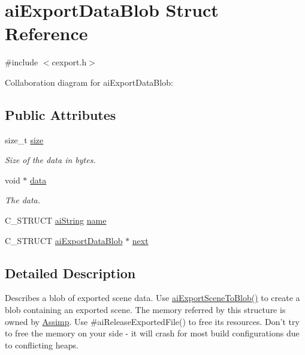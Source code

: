 \hypertarget{structai_export_data_blob}{\section{ai\+Export\+Data\+Blob Struct Reference}
\label{structai_export_data_blob}
}


{\ttfamily \#include $<$cexport.\+h$>$}



Collaboration diagram for ai\+Export\+Data\+Blob\+:
\subsection*{Public Attributes}
\begin{DoxyCompactItemize}
\item 
\hypertarget{structai_export_data_blob_a339bfaacc70396b2f99f94c1bc3b808f}{size\+\_\+t \hyperlink{structai_export_data_blob_a339bfaacc70396b2f99f94c1bc3b808f}{size}}\label{structai_export_data_blob_a339bfaacc70396b2f99f94c1bc3b808f}

\begin{DoxyCompactList}\small\item\em Size of the data in bytes. \end{DoxyCompactList}\item 
\hypertarget{structai_export_data_blob_ac080c780dad92077b42447d77a1a9ed1}{void $\ast$ \hyperlink{structai_export_data_blob_ac080c780dad92077b42447d77a1a9ed1}{data}}\label{structai_export_data_blob_ac080c780dad92077b42447d77a1a9ed1}

\begin{DoxyCompactList}\small\item\em The data. \end{DoxyCompactList}\item 
C\+\_\+\+S\+T\+R\+U\+C\+T \hyperlink{structai_string}{ai\+String} \hyperlink{structai_export_data_blob_af7f006ac5ad818c0d81d520a84f74c3e}{name}
\item 
C\+\_\+\+S\+T\+R\+U\+C\+T \hyperlink{structai_export_data_blob}{ai\+Export\+Data\+Blob} $\ast$ \hyperlink{structai_export_data_blob_a3e98fa760f45983ff1bccec6715f3817}{next}
\end{DoxyCompactItemize}


\subsection{Detailed Description}
Describes a blob of exported scene data. Use \hyperlink{cexport_8h_a33b02f2dbfd79980bf29e62f3a64139f}{ai\+Export\+Scene\+To\+Blob()} to create a blob containing an exported scene. The memory referred by this structure is owned by \hyperlink{class_assimp}{Assimp}. Use \#ai\+Release\+Exported\+File() to free its resources. Don't try to free the memory on your side -\/ it will crash for most build configurations due to conflicting heaps.


